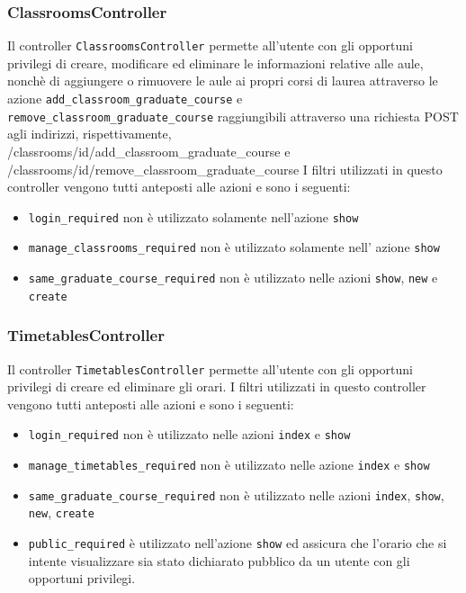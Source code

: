 \documentclass[11pt,a4paper]{article}
\begin{document}
\subsubsection{ClassroomsController}
Il controller \verb|ClassroomsController| permette all'utente con gli opportuni privilegi di creare, modificare ed eliminare le informazioni relative alle aule, nonchè di aggiungere o rimuovere le aule ai propri corsi di laurea attraverso le azione \verb|add_classroom_graduate_course| e \\ \verb|remove_classroom_graduate_course| raggiungibili attraverso una richiesta POST agli indirizzi, rispettivamente,\\ /classrooms/id/add\_classroom\_graduate\_course e \\ /classrooms/id/remove\_classroom\_graduate\_course
I filtri utilizzati in questo controller vengono tutti anteposti alle azioni e sono i seguenti:
\begin{itemize}
 \item \verb|login_required| non è utilizzato solamente nell'azione \verb|show|
 \item \verb|manage_classrooms_required| non è utilizzato solamente nell' azione \verb|show|
 \item \verb|same_graduate_course_required| non è utilizzato nelle azioni \verb|show|, \verb|new| e \verb|create|
\end{itemize}
\subsubsection{TimetablesController}
Il controller \verb|TimetablesController| permette all'utente con gli opportuni privilegi di creare ed eliminare gli orari.
I filtri utilizzati in questo controller vengono tutti anteposti alle azioni e sono i seguenti:
\begin{itemize}
 \item \verb|login_required| non è utilizzato nelle azioni \verb|index| e \verb|show|
 \item \verb|manage_timetables_required| non è utilizzato nelle azione \verb|index| e \verb|show|
 \item \verb|same_graduate_course_required| non è utilizzato nelle azioni \verb|index|, \verb|show|, \verb|new|, \verb|create|
 \item \verb|public_required| è utilizzato nell'azione \verb|show| ed assicura che l'orario che si intente visualizzare sia stato dichiarato pubblico da un utente con gli opportuni privilegi.
\end{itemize}
\end{document}
